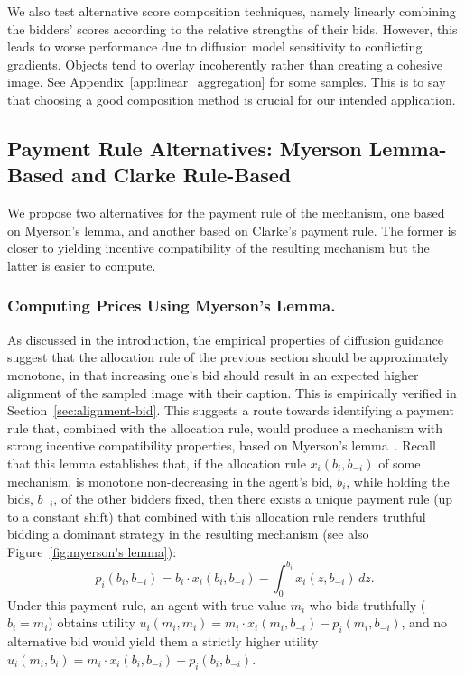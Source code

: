 \documentclass[format=acmsmall, review=false]{acmart}
\begin{document}
We also test alternative score composition techniques, namely linearly combining the bidders' scores according to the relative strengths of their bids. However, this leads to worse performance due to diffusion model sensitivity to conflicting gradients. Objects tend to overlay incoherently rather than creating a cohesive image. See Appendix~\ref{app:linear_aggregation} for some samples. This is to say that choosing a good composition method is crucial for our intended application.

\subsection{Payment Rule Alternatives: Myerson Lemma-Based and Clarke Rule-Based}
\label{sec:payment_rule}

We propose two alternatives for the payment rule of the mechanism, one based on Myerson's lemma, and another based on Clarke's payment rule. The former is closer to yielding incentive compatibility of the resulting mechanism but the latter is easier to compute.

\subsubsection{Computing Prices Using Myerson's Lemma.} \label{sec:payments via Myerson's lemma} As discussed in the introduction, the empirical properties of diffusion guidance suggest that the allocation rule of the previous section should be approximately monotone, in that increasing one's bid should result in an expected higher alignment of the sampled image with their caption. This is empirically verified in Section~\ref{sec:alignment-bid}. This suggests a route towards identifying a payment rule that, combined with the allocation rule, would produce a mechanism with strong incentive compatibility properties, based on Myerson's lemma~\cite{myerson1981optimal}. 
Recall that this lemma establishes that, if the allocation rule $x_i(b_i,b_{-i})$ of some mechanism, is monotone non-decreasing in the agent's bid, $b_i$, while holding the bids, $b_{-i}$, of the other bidders fixed, then there exists a unique payment rule (up to a constant shift) that combined with this allocation rule renders truthful bidding a dominant strategy in the resulting mechanism (see also Figure~\ref{fig:myerson's lemma}):
\begin{equation}
    p_i(b_i,b_{-i}) = b_i \cdot x_i(b_i,b_{-i}) - \int_0^{b_i} x_i(z,b_{-i}) \, dz.
    \label{eq:myerson_payment}
\end{equation}
Under this payment rule, an agent with true value $m_i$ who bids truthfully ($b_i = m_i$) obtains utility $u_i(m_i,m_i) = m_i \cdot x_i(m_i,b_{-i}) - p_i(m_i,b_{-i})$, and no alternative bid would yield them a strictly higher utility $u_i(m_i,b_i) = m_i \cdot x_i(b_i,b_{-i}) - p_i(b_i,b_{-i})$. 
\end{document}
